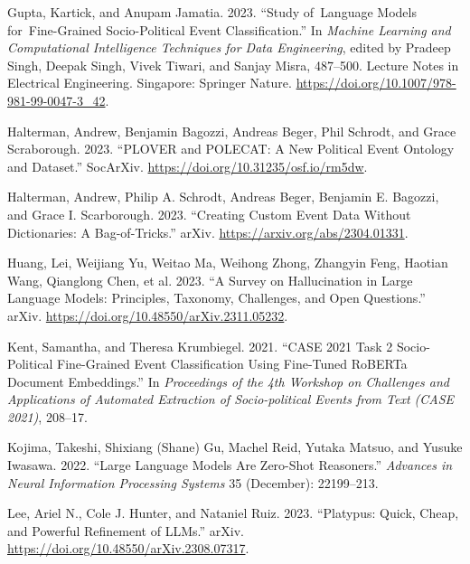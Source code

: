 \documentclass[
]{article}
\newlength{\cslhangindent}
\newenvironment{CSLReferences}[2] %
 {\begin{list}{}{%
  \setlength{\itemindent}{0pt}
  \setlength{\leftmargin}{0pt}
  \setlength{\parsep}{0pt}
  \ifodd #1
   \setlength{\leftmargin}{\cslhangindent}
   \setlength{\itemindent}{-1\cslhangindent}
  \fi
  \setlength{\itemsep}{#2\baselineskip}}}
 {\end{list}}
\begin{document}
\begin{CSLReferences}{1}{0}
Gupta, Kartick, and Anupam Jamatia. 2023. {``Study of~{Language Models}
for~{Fine-Grained Socio-Political Event Classification}.''} In
\emph{Machine {Learning} and {Computational Intelligence Techniques} for
{Data Engineering}}, edited by Pradeep Singh, Deepak Singh, Vivek
Tiwari, and Sanjay Misra, 487--500. Lecture {Notes} in {Electrical
Engineering}. {Singapore}: {Springer Nature}.
\url{https://doi.org/10.1007/978-981-99-0047-3_42}.

Halterman, Andrew, Benjamin Bagozzi, Andreas Beger, Phil Schrodt, and
Grace Scraborough. 2023. {``{PLOVER} and {POLECAT}: {A New Political
Event Ontology} and {Dataset}.''} {SocArXiv}.
\url{https://doi.org/10.31235/osf.io/rm5dw}.

Halterman, Andrew, Philip A. Schrodt, Andreas Beger, Benjamin E.
Bagozzi, and Grace I. Scarborough. 2023. {``Creating {Custom Event Data
Without Dictionaries}: {A Bag-of-Tricks}.''} {arXiv}.
\url{https://arxiv.org/abs/2304.01331}.

Huang, Lei, Weijiang Yu, Weitao Ma, Weihong Zhong, Zhangyin Feng,
Haotian Wang, Qianglong Chen, et al. 2023. {``A {Survey} on
{Hallucination} in {Large Language Models}: {Principles}, {Taxonomy},
{Challenges}, and {Open Questions}.''} {arXiv}.
\url{https://doi.org/10.48550/arXiv.2311.05232}.

Kent, Samantha, and Theresa Krumbiegel. 2021. {``{CASE} 2021 Task 2
Socio-Political Fine-Grained Event Classification Using Fine-Tuned
{RoBERTa} Document Embeddings.''} In \emph{Proceedings of the 4th
{Workshop} on {Challenges} and {Applications} of {Automated Extraction}
of {Socio-political Events} from {Text} ({CASE} 2021)}, 208--17.

Kojima, Takeshi, Shixiang (Shane) Gu, Machel Reid, Yutaka Matsuo, and
Yusuke Iwasawa. 2022. {``Large {Language Models} Are {Zero-Shot
Reasoners}.''} \emph{Advances in Neural Information Processing Systems}
35 (December): 22199--213.

Lee, Ariel N., Cole J. Hunter, and Nataniel Ruiz. 2023. {``Platypus:
{Quick}, {Cheap}, and {Powerful Refinement} of {LLMs}.''} {arXiv}.
\url{https://doi.org/10.48550/arXiv.2308.07317}.


\end{CSLReferences}
\end{document}
